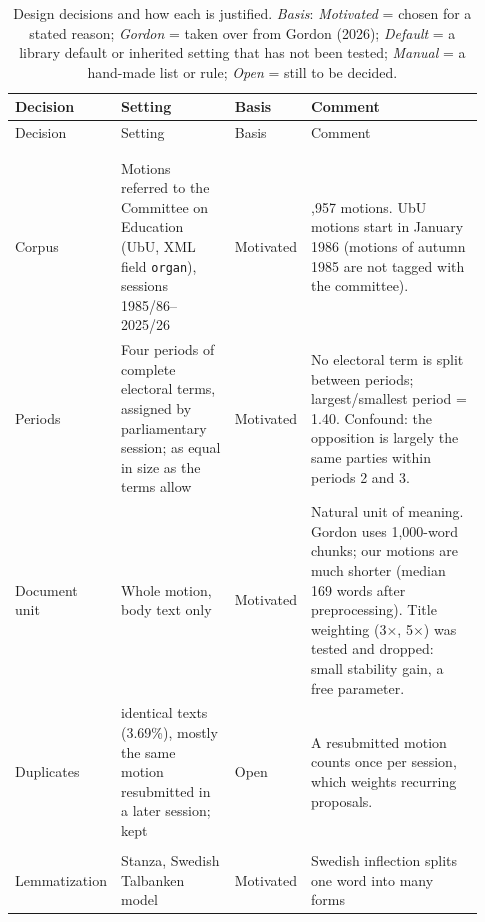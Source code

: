 \begin{landscape}
\clearpage
{\small
\renewcommand{\arraystretch}{1.25}
\setlength{\LTcapwidth}{\linewidth}
\begin{longtable}{@{}>{\raggedright\arraybackslash}p{0.17\linewidth}
                   >{\raggedright\arraybackslash}p{0.25\linewidth}
                   >{\raggedright\arraybackslash}p{0.11\linewidth}
                   >{\raggedright\arraybackslash}p{0.40\linewidth}@{}}
\caption{Design decisions and how each is justified. \emph{Basis}: \emph{Motivated} = chosen for a stated reason;
\emph{Gordon} = taken over from Gordon (2026); \emph{Default} = a library default or inherited setting that has not been
tested; \emph{Manual} = a hand-made list or rule; \emph{Open} = still to be decided.}
\label{tab:design-decisions} \\
\toprule
Decision & Setting & Basis & Comment \\
\midrule
\endfirsthead
\toprule
Decision & Setting & Basis & Comment \\
\midrule
\endhead
\midrule
\multicolumn{4}{r@{}}{\emph{continued on next page}} \\
\endfoot
\bottomrule
\endlastfoot
\multicolumn{4}{@{}l}{\textbf{Corpus and documents}} \\
Corpus & Motions referred to the Committee on Education (UbU, XML field \texttt{organ}), sessions 1985/86--2025/26 &
  Motivated & 13,957 motions. UbU motions start in January 1986 (motions of autumn 1985 are not tagged with the committee). \\
Periods & Four periods of complete electoral terms, assigned by parliamentary session; as equal in size as the terms allow &
  Motivated & No electoral term is split between periods; largest/smallest period = 1.40. Confound: the opposition is
  largely the same parties within periods 2 and 3. \\
Document unit & Whole motion, body text only & Motivated & Natural unit of meaning. Gordon uses 1,000-word chunks;
  our motions are much shorter (median 169 words after preprocessing). Title weighting (3$\times$, 5$\times$) was tested
  and dropped: small stability gain, a free parameter. \\
Duplicates & 515 identical texts (3.69\%), mostly the same motion resubmitted in a later session; kept & Open &
  A resubmitted motion counts once per session, which weights recurring proposals. \\
\addlinespace
\multicolumn{4}{@{}l}{\textbf{Preprocessing}} \\
Lemmatization & Stanza, Swedish Talbanken model & Motivated & Swedish inflection splits one word into many forms

\end{longtable}}
\end{landscape}
